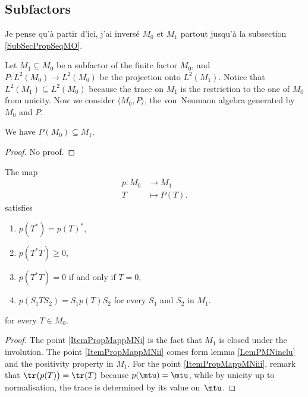 					\subsection{Subfactors}

\begin{probleme}
Je pense qu'à partir d'ici, j'ai inversé $M_0$ et $M_1$ partout jusqu'à la subsection \ref{SubSecPropSeqMO}.
\end{probleme}

Let $M_1\subseteq M_0$ be a subfactor of the finite factor $M_0$, and $P\colon L^2(M_0)\to L^2(M_0)$ be the projection onto $L^2(M_1)$. Notice that $L^2(M_1)\subseteq L^2(M_0)$ because the trace on $M_1$ is the restriction to the one of $M_0$ from unicity. Now we consider $\langle M_0, P\rangle $, the von~Neumann algebra generated by $M_0$ and $P$.

\begin{lemma}		\label{LemPMNinclu}
We have $P(M_0)\subseteq M_1$.
\end{lemma}
\begin{proof}
No proof.
\end{proof}

\begin{proposition}		\label{PropPropMappMN}
The map
\begin{equation}
\begin{aligned}
p \colon M_0&\to M_1 \\ 
   T&\mapsto P(T). 
\end{aligned}
\end{equation}
satisfies
\begin{enumerate}
\item\label{ItemPropMappMNi} $p(T^*)=p(T)^*$,
\item\label{ItemPropMappMNii}$p(T^*T)\geq 0$,
\item\label{ItemPropMappMNiii} $p(T^*T)=0$ if and only if $T=0$,
\item\label{ItemPropMappMNiv} $p(S_1TS_2)=S_1p(T)S_2$ for every $S_1$ and $S_2$ in $M_1$.
\end{enumerate}
for every $T\in M_0$.
\end{proposition}

\begin{proof}
The point \ref{ItemPropMappMNi} is the fact that $M_1$ is closed under the involution. The point \ref{ItemPropMappMNii} comes form lemma \ref{LemPMNinclu} and the positivity property in $M_1$. For the point \ref{ItemPropMappMNiii}, remark that $\tr\big( p(T) \big)=\tr(T)$ because $p(\mtu)=\mtu$, while by unicity up to normalisation, the trace is determined by its value on~$\mtu$.
\end{proof}
 
